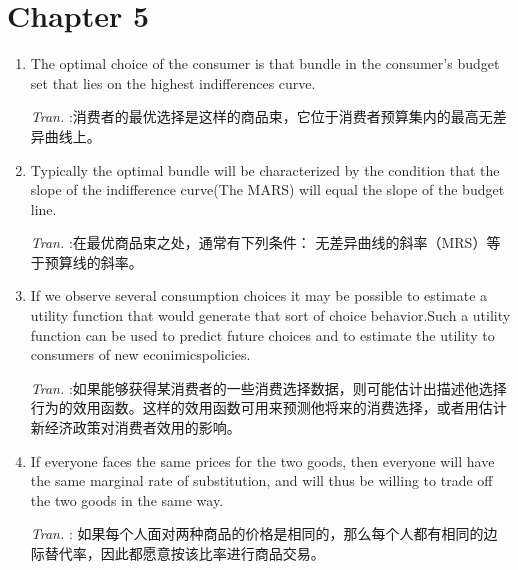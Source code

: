 \documentclass[11pt]{article}
\begin{document}
\section{Chapter 5}
\label{sec:orga43a6ae}
\begin{enumerate}
\item The optimal choice of the consumer is that bundle in the consumer's budget set that lies on the highest indifferences curve.

\emph{Tran.} :消费者的最优选择是这样的商品束，它位于消费者预算集内的最高无差异曲线上。

\item Typically the optimal bundle will be characterized by the condition that the slope of the indifference curve(The MARS) will equal the slope of the budget line.

\emph{Tran.} :在最优商品束之处，通常有下列条件： 无差异曲线的斜率（MRS）等于预算线的斜率。

\item If we observe several consumption choices it may be possible to estimate a utility function that would generate that sort of choice behavior.Such a utility function can be used to predict future choices and to estimate the utility to consumers of new econimicspolicies.

\emph{Tran.} :如果能够获得某消费者的一些消费选择数据，则可能估计出描述他选择行为的效用函数。这样的效用函数可用来预测他将来的消费选择，或者用估计新经济政策对消费者效用的影响。

\item If everyone faces the same prices for the two goods, then everyone will have the same marginal rate of substitution, and will thus be willing to trade off the two goods in the same way.

\emph{Tran.} : 如果每个人面对两种商品的价格是相同的，那么每个人都有相同的边际替代率，因此都愿意按该比率进行商品交易。
\end{enumerate}
\end{document}

